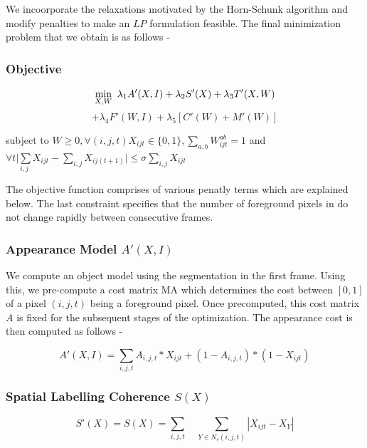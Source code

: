 We incoorporate the relaxations motivated by the Horn-Schunk algorithm
and modify penalties to make an $LP$ formulation feasible. The final
minimization problem that we obtain is as follows -


\subsubsection*{Objective}

\begin{equation}
\underset{X,W}{\min}\enskip\lambda_{1}A'(X,I)+\lambda_{2}S'(X)+\lambda_{3}T'(X,W)
\end{equation}
\[
+\lambda_{4}F'(W,I)+\lambda_{5}[C'(W)+M'(W)]
\]


\begin{center}
subject to $W\geq0,\forall(i,j,t)X_{ijt}\in\{0,1\},\underset{a,b}{\sum}W_{ijt}^{ab}=1$
and $\forall t\underset{i,j}{|\sum}X_{ijt}-\underset{i,j}{\sum}X_{ij(t+1)}|\leq\sigma\underset{i,j}{\sum}X_{ijt}$ 
\par\end{center}

\noindent The objective function comprises of various penatly terms
which are explained below. The last constraint specifies that the
number of foreground pixels in do not change rapidly between consecutive
frames.

\subsubsection*{Appearance Model $A'(X,I)$}

We compute an object model using the segmentation in the first frame.
Using this, we pre-compute a cost matrix MA which determines the cost
between $[0,1]$ of a pixel $(i,j,t)$ being a foreground pixel. Once
precomputed, this cost matrix $A$ is fixed for the subsequent stages
of the optimization. The appearance cost is then computed as follows
-

\begin{equation}
A'(X,I)=\underset{i,j,t}{\sum}A_{i,j,t}*X_{ijt}+(1-A_{i,j,t})*(1-X_{ijt})
\end{equation}



\subsubsection*{Spatial Labelling Coherence $S(X)$}

\begin{equation}
S'(X)=S(X)=\underset{i,j,t}{\sum}\quad\underset{Y\in N_{s}(i,j,t)}{\sum}|X_{ijt}-X_{Y}|
\end{equation}



